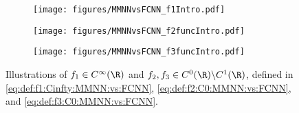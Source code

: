 \documentclass[11pt,a4paper]{article}
\begin{document}
\begin{itemize}

\end{itemize}

\begin{figure}[ht]%
            \centering
  \begin{subfigure}[b]{0.95\textwidth}
                    \centering            
                    \texttt{[image: figures/MMNNvsFCNN\_f1Intro.pdf]}
                \end{subfigure}
            \begin{subfigure}[b]{0.95\textwidth}
                    \centering            
                    \texttt{[image: figures/MMNNvsFCNN\_f2funcIntro.pdf]}
                \end{subfigure}
            \begin{subfigure}[b]{0.95\textwidth}
                    \centering            
                    \texttt{[image: figures/MMNNvsFCNN\_f3funcIntro.pdf]}
                \end{subfigure}
\caption{Illustrations of $f_1\in C^\infty(\R)$ and $f_2,f_3\in C^0(\R)\backslash 
 C^1(\R)$, defined in \eqref{eq:def:f1:Cinfty:MMNN:vs:FCNN}, \eqref{eq:def:f2:C0:MMNN:vs:FCNN}, and \eqref{eq:def:f3:C0:MMNN:vs:FCNN}.}
    \label{fig:f1:f2:intro}   
\end{figure}
\end{document}
